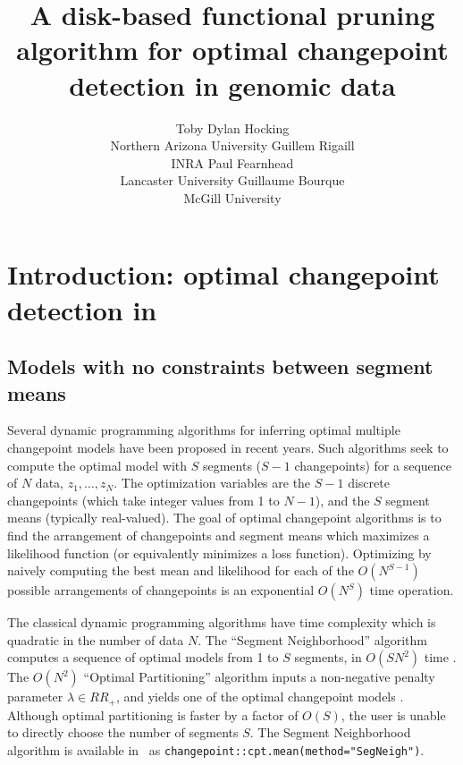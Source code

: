 \documentclass[article]{jss}
\author{Toby Dylan Hocking\\Northern Arizona University
   \And Guillem Rigaill\\INRA
   \And Paul Fearnhead\\Lancaster University
   \And Guillaume Bourque\\McGill University}
\title{A disk-based functional pruning algorithm for optimal changepoint
  detection in genomic data}
\newcommand{\R}{\proglang{R}}
\begin{document}


\section[Introduction: optimal changepoint detection in R]{Introduction: optimal changepoint detection in } \label{sec:intro}

\subsection{Models with no constraints between segment means}

Several dynamic programming algorithms for inferring optimal multiple
changepoint models have been proposed in recent years. Such algorithms
seek to compute the optimal model with $S$ segments ($S-1$
changepoints) for a sequence of $N$ data, $z_1,\dots,z_N$. The
optimization variables are the $S-1$ discrete changepoints (which take
integer values from 1 to $N-1$), and the $S$ segment means (typically
real-valued). The goal of optimal changepoint algorithms is to find
the arrangement of changepoints and segment means which maximizes a
likelihood function (or equivalently minimizes a loss
function). Optimizing by naively computing the best mean and
likelihood for each of the $O(N^{S-1})$ possible arrangements of
changepoints is an exponential $O(N^S)$ time operation.

The classical dynamic programming algorithms have time complexity
which is quadratic in the number of data $N$. The ``Segment
Neighborhood'' algorithm computes a sequence of optimal models from 1
to $S$ segments, in $O(SN^2)$ time \citet{segment-neighborhood}. The
$O(N^2)$ ``Optimal Partitioning'' algorithm inputs a non-negative
penalty parameter $\lambda\in RR_+$, and yields one of the optimal
changepoint models \citet{optimal-partitioning}. Although optimal
partitioning is faster by a factor of $O(S)$, the user is unable to
directly choose the number of segments $S$. The Segment Neighborhood
algorithm is available in \R\ as
\verb|changepoint::cpt.mean(method="SegNeigh")|.
\end{document}
